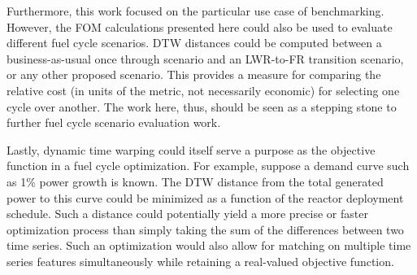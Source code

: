 Furthermore, this work focused on the particular use case of benchmarking.
However, the FOM calculations presented here could also be used to evaluate 
different fuel cycle scenarios. DTW distances could be computed between
a business-as-usual once through scenario and an LWR-to-FR transition
scenario, or any other proposed scenario. This provides a measure for 
comparing the relative cost (in units of the metric, not necessarily 
economic) for selecting one cycle over another. The work here, thus, 
should be seen as a stepping stone to further fuel cycle scenario evaluation
work.

Lastly, dynamic time warping could itself serve a purpose as the objective 
function in a fuel cycle optimization.  For example, suppose a demand curve 
such as 1\% power growth is known. The DTW distance from the total generated
power to this curve could be minimized as a function of the reactor 
deployment schedule. Such a distance could potentially yield a more 
precise or faster optimization process than simply taking the sum of 
the differences between two time series. Such an optimization would also allow
for matching on multiple time series features simultaneously while retaining
a real-valued objective function.

